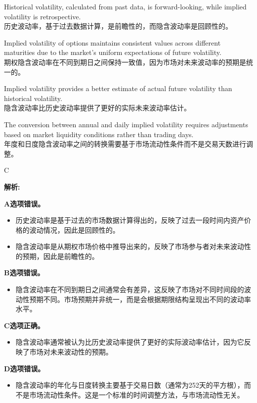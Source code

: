 \documentclass{article}
\newenvironment{explanation}
{\textbf{解析:}\par}
{\par}
\begin{document}
\begin{choices}
    \item Historical volatility, calculated from past data, is forward-looking, while implied volatility is retrospective. \\
    历史波动率，基于过去数据计算，是前瞻性的，而隐含波动率是回顾性的。
    
    \item Implied volatility of options maintains consistent values across different maturities due to the market's uniform expectations of future volatility. \\
    期权隐含波动率在不同到期日之间保持一致值，因为市场对未来波动率的预期是统一的。
    
    \item Implied volatility provides a better estimate of actual future volatility than historical volatility. \\
    隐含波动率比历史波动率提供了更好的实际未来波动率估计。
    
    \item The conversion between annual and daily implied volatility requires adjustments based on market liquidity conditions rather than trading days. \\
    年度和日度隐含波动率之间的转换需要基于市场流动性条件而不是交易天数进行调整。
\end{choices}

\begin{correctanswer}
    C
\end{correctanswer}

\begin{explanation}
    \textbf{A选项错误。}
    \begin{itemize}
        \item 历史波动率是基于过去的市场数据计算得出的，反映了过去一段时间内资产价格的波动情况，因此是回顾性的。
        \item 隐含波动率是从期权市场价格中推导出来的，反映了市场参与者对未来波动性的预期，因此是前瞻性的。
    \end{itemize}

    \textbf{B选项错误。}
    \begin{itemize}
        \item 隐含波动率在不同到期日之间通常会有差异，这反映了市场对不同时间段的波动性预期不同。市场预期并非统一，而是会根据期限结构呈现出不同的波动率水平。
    \end{itemize}

    \textbf{C选项正确。}
    \begin{itemize}
        \item 隐含波动率通常被认为比历史波动率提供了更好的实际波动率估计，因为它反映了市场对未来波动性的预期。
    \end{itemize}

    \textbf{D选项错误。}
    \begin{itemize}
        \item 隐含波动率的年化与日度转换主要基于交易日数（通常为252天的平方根），而不是市场流动性条件。这是一个标准的时间调整方法，与市场流动性无关。
    \end{itemize}
\end{explanation}
\end{document}
